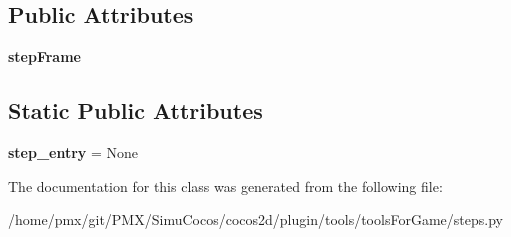 \subsection*{Public Attributes}
\begin{DoxyCompactItemize}
\item 
\mbox{\label{classsteps_1_1step1_ade45e1e2ffa3149441027df798353bdd}} 
{\bfseries step\+Frame}
\end{DoxyCompactItemize}
\subsection*{Static Public Attributes}
\begin{DoxyCompactItemize}
\item 
\mbox{\label{classsteps_1_1step1_a0ee6132a2d417d2cb6e71a35bb6fd51f}} 
{\bfseries step\+\_\+entry} = None
\end{DoxyCompactItemize}


The documentation for this class was generated from the following file\+:\begin{DoxyCompactItemize}
\item 
/home/pmx/git/\+P\+M\+X/\+Simu\+Cocos/cocos2d/plugin/tools/tools\+For\+Game/steps.\+py\end{DoxyCompactItemize}
